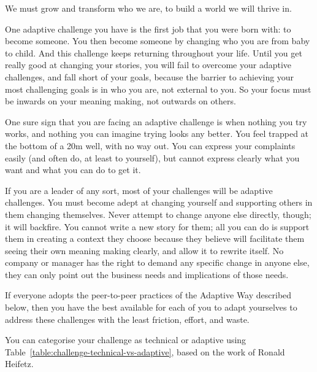We must grow and transform who we are, to build a world we will thrive in. 






One adaptive challenge you have is the first job that you were born with: to become someone. You then become someone by changing who you are from baby to child. And this challenge keeps returning throughout your life. Until you get really good at changing your stories, you will fail to overcome your adaptive challenges, and fall short of your goals, because the barrier to achieving your most challenging goals is in who you are, not external to you. So your focus must be inwards on your meaning making, not outwards on others.


One sure sign that you are facing an adaptive challenge is when nothing you try works, and nothing you can imagine trying looks any better. You feel trapped at the bottom of a 20m well, with no way out. You can express your complaints easily (and often do, at least to yourself), but cannot express clearly what you want and what you can do to get it.


If you are a leader of any sort, most of your challenges will be adaptive challenges. You must become adept at changing yourself and supporting others in them changing themselves. Never attempt to change anyone else directly, though; it will backfire. You cannot write a new story for them; all you can do is support them in creating a context they choose because they believe will facilitate them seeing their own meaning making clearly, and allow it to rewrite itself. No company or manager has the right to demand any specific change in anyone else, they can only point out the business needs and implications of those needs.


If everyone adopts the peer-to-peer practices of the Adaptive Way  described below, then you have the best available for each of you to adapt yourselves to address these challenges with the least friction, effort, and waste. 


You can categorise your challenge as technical or adaptive using Table~\ref{table:challenge-technical-vs-adaptive}, based on the work of Ronald Heifetz\cite{heifetz-practice}.


